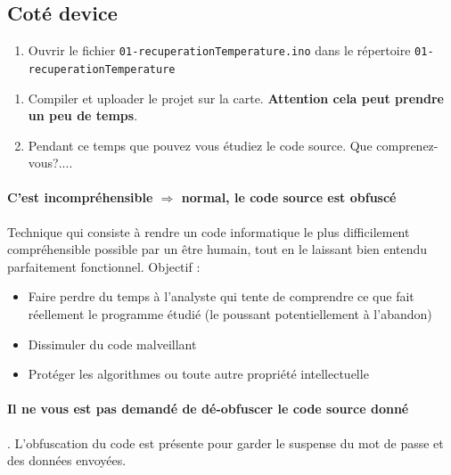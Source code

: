 \documentclass[french, 12pt]{article}%
\newcommand{\itemE}{\item[$\bullet$]}
\newcommand{\titreencadre}{Titre}
\newenvironment{encadre}[1]{\renewcommand{\titreencadre}{#1}
	\begin{mdframed}[style=encadrestyle]
	\vspace{0.5\baselineskip}
	}{%
	\end{mdframed}}
\begin{document}
\subsection{Coté device}

\begin{enumerate} [resume]
\item Ouvrir  le fichier \verb?01-recuperationTemperature.ino? dans le répertoire \verb?01-recuperationTemperature? 
\end{enumerate}
%

\begin{enumerate} [resume]
\item Compiler et uploader le projet sur la carte. \textbf{Attention cela peut prendre un peu de temps}.
\item Pendant ce temps que pouvez vous étudiez le code source. Que comprenez-vous?.... 
\end{enumerate}

\paragraph{C'est incompréhensible $\Rightarrow$ normal, le code source est obfuscé}


\begin{encadre}{Obfuscation}
Technique qui consiste à rendre un code informatique le plus difficilement compréhensible possible par un être humain, tout en le laissant bien entendu parfaitement fonctionnel. Objectif : 
\begin{itemize}
\itemE Faire  perdre du temps à l’analyste qui tente de comprendre ce que fait réellement le programme étudié (le poussant potentiellement à l'abandon)
\itemE Dissimuler du code malveillant
\itemE Protéger les algorithmes ou toute autre propriété intellectuelle
\end{itemize}
\end{encadre}

\paragraph{Il ne vous est pas demandé de dé-obfuscer le code source donné}. L'obfuscation du code est présente pour garder le suspense du mot de passe et des données envoyées. 

\vspace{0.5cm}
\end{document}
